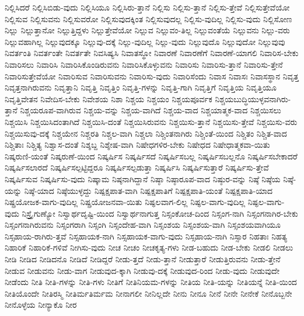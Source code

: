 {ನಿಲ್ಲಿಸಿದರೆ
ನಿಲ್ಲಿಸಿಬಿಡು-ವುದು
ನಿಲ್ಲಿಸಿಯೂ
ನಿಲ್ಲಿಸಿರು-ತ್ತಾನೆ
ನಿಲ್ಲಿಸು
ನಿಲ್ಲಿಸು-ತ್ತಾನೆ
ನಿಲ್ಲಿಸು-ತ್ತೇವೆ
ನಿಲ್ಲಿಸುತ್ತೇವೆಯೋ
ನಿಲ್ಲಿಸುವ
ನಿಲ್ಲಿಸುವನು
ನಿಲ್ಲಿಸುವರೋ
ನಿಲ್ಲಿಸುವುದಕ್ಕಿಂತ
ನಿಲ್ಲಿಸುವುದಲ್ಲ
ನಿಲ್ಲಿಸು-ವುದಿಲ್ಲ
ನಿಲ್ಲಿಸು-ವುದು
ನಿಲ್ಲಿಸೋಣ
ನಿಲ್ಲು
ನಿಲ್ಲುತ್ತಾನೋ
ನಿಲ್ಲುತ್ತಿದ್ದಳು
ನಿಲ್ಲುತ್ತೇವೆಯೋ
ನಿಲ್ಲುವ
ನಿಲ್ಲುವಂ-ತಿಲ್ಲ
ನಿಲ್ಲುವಂತೆಯೆ
ನಿಲ್ಲುವನು
ನಿಲ್ಲು-ವರು
ನಿಲ್ಲುವಹಾಗಿಲ್ಲ
ನಿಲ್ಲುವುದಕ್ಕೂ
ನಿಲ್ಲುವು-ದಕ್ಕೆ
ನಿಲ್ಲು-ವುದಿಲ್ಲ
ನಿಲ್ಲು-ವುದು
ನಿಲ್ಲುವುದೊ
ನಿಲ್ಲುವುದೋ
ನಿಲ್ಲುವುವು
ನಿವರ್ತಂತಿ
ನಿವರ್ತಂತೇ
ನಿವರ್ತತೇ
ನಿವಸಿಷ್ಯಸಿ
ನಿವಾತಸ್ಥೋ
ನಿವಾರಣೆ
ನಿವಾರಣೆಗೆ
ನಿವಾರಣೆ-ಯಾಗಲಿ
ನಿವಾರಿಸ-ಬೇಕು
ನಿವಾರಿಸಲು
ನಿವಾರಿಸಿ
ನಿವಾರಿಸಿಕೊಂಡಿರುವನು
ನಿವಾರಿಸಿಕೊಳ್ಳುವನು
ನಿವಾರಿಸು
ನಿವಾರಿಸು-ತ್ತಾನೆ
ನಿವಾರಿಸು-ತ್ತೇನೆ
ನಿವಾರಿಸುತ್ತೇವೆಯೋ
ನಿವಾರಿಸುವ
ನಿವಾರಿಸುವನು
ನಿವಾರಿಸು-ವುದು
ನಿವಾರಿಸೆಂದು
ನಿವಾಸ
ನಿವಾಸಃ
ನಿವಾಸಸ್ಥಾನ
ನಿವೃತ್ತ
ನಿವೃತ್ತನಾಗಿರುವನು
ನಿವೃತ್ತಾನಿ
ನಿವೃತ್ತಿ
ನಿವೃತ್ತಿಂ
ನಿವೃತ್ತಿ-ಗಳನ್ನು
ನಿವೃತ್ತಿ-ಗಾಗಿ
ನಿವೃತ್ತಿಗೆ
ನಿವೃತ್ತಿಯ
ನಿವೃತ್ತಿಯೂ
ನಿವೃತ್ತಿವೇತನ
ನಿವೇದಿಸ-ಬೇಕು
ನಿವೇಶಯ
ನಿಶಾ
ನಿಶ್ಚಯ
ನಿಶ್ಚಯಂ
ನಿಶ್ಚಯಪೂರ್ವಕ
ನಿಶ್ಚಯಬುದ್ಧಿಯುಳ್ಳವನಾಗಿರು-ತ್ತಾನೆ
ನಿಶ್ಚಯರೂಪ-ವಾಗಿರುವ
ನಿಶ್ಚಯ-ವನ್ನು
ನಿಶ್ಚಯ-ವಾಗಿದೆ
ನಿಶ್ಚಯ-ವಾದ
ನಿಶ್ಚಯಾತ್ಮಕ-ವಾದ
ನಿಶ್ಚಯಿಸಲು
ನಿಶ್ಚಯಿಸಿ
ನಿಶ್ಚಯಿಸಿದಂತಾಗಿದೆ
ನಿಶ್ಚಯಿಸಿ-ದಂತೆ
ನಿಶ್ಚಯಿಸಿರುವನು
ನಿಶ್ಚಯಿಸು-ತ್ತಾನೆ
ನಿಶ್ಚಯಿಸು-ತ್ತೇವೆ
ನಿಶ್ಚಯಿಸು-ವರು
ನಿಶ್ಚಯಿಸುವು-ದಕ್ಕೆ
ನಿಶ್ಚಯೇನ
ನಿಶ್ಚರತಿ
ನಿಶ್ಚಲ-ವಾಗಿ
ನಿಶ್ಚಲಾ
ನಿಶ್ಚಿಂತನಾಗಿರು
ನಿಶ್ಚಿಂತೆ-ಯಿಂದ
ನಿಶ್ಚಿತಂ
ನಿಶ್ಚಿತ-ವಾದ
ನಿಶ್ಚಿತಾಃ
ನಿಶ್ಚಿತ್ಯ
ನಿಶ್ವಾಸ-ದಂತೆ
ನಿಶ್ಶಬ್ದ
ನಿಶ್ಶೇಷ-ವಾಗಿ
ನಿಷೇಧಗಳಿರ-ಬೇಕು
ನಿಷೇಧದ
ನಿಷೇಧಾತ್ಮಕವಾ-ಯಿತು
ನಿಷ್ಕರುಣಿ-ಯಂತೆ
ನಿಷ್ಕರುಣೆ-ಯಿಂದ
ನಿಷ್ಕರ್ಷಿಸ
ನಿಷ್ಕರ್ಷಿಸದೆ
ನಿಷ್ಕರ್ಷಿಸಬಲ್ಲ
ನಿಷ್ಕರ್ಷಿಸಬಲ್ಲನೊ
ನಿಷ್ಕರ್ಷಿಸಬೇಕಾದರೆ
ನಿಷ್ಕರ್ಷಿಸಲಾರದೆ
ನಿಷ್ಕರ್ಷಿಸಲ್ಪಟ್ಟಿದ್ದರೂ
ನಿಷ್ಕರ್ಷಿಸಲ್ಪಡುತ್ತಾ
ನಿಷ್ಕರ್ಷಿಸಿ
ನಿಷ್ಕರ್ಷಿಸುತ್ತಾರೆ
ನಿಷ್ಕರ್ಷಿಸು-ತ್ತೇವೆ
ನಿಷ್ಕರ್ಷಿಸುವ
ನಿಷ್ಕರ್ಷಿಸು-ವುದು
ನಿಷ್ಕಾಮ
ನಿಷ್ಠನಾಗಿದ್ದಾನೆ
ನಿಷ್ಠಾ
ನಿಷ್ಠಾರೂಪ-ವಾದ
ನಿಷ್ಠುರ-ವನ್ನು
ನಿಷ್ಠೆ
ನಿಷ್ಠೆಯ
ನಿಷ್ಠೆ-ಯನ್ನು
ನಿಷ್ಠೆ-ಯಾದ
ನಿಷ್ಠೆಯುಳ್ಳದ್ದು
ನಿಷ್ಪಕ್ಷಪಾತ-ವಾಗಿ
ನಿಷ್ಪಕ್ಷಪಾತಿಗೆ
ನಿಷ್ಪಕ್ಷಪಾತಿ-ಯಂತೆ
ನಿಷ್ಪಕ್ಷಪಾತಿ-ಯಾದ
ನಿಷ್ಪ್ರಯೋಜಕ-ವಾಗು-ವುದಿಲ್ಲ
ನಿಷ್ಪ್ರಯೋಜನವಾ-ಯಿತು
ನಿಷ್ಫಲವಾಗ-ಲಿಲ್ಲ
ನಿಷ್ಫಲ-ವಾಗು-ವುದಿಲ್ಲ
ನಿಷ್ಫಲ-ವಾಗು-ವುದು
ನಿಸ್ತ್ರೈಗುಣ್ಯೋ
ನಿಸ್ವಾರ್ಥದೃಷ್ಟಿ-ಯಿಂದ
ನಿಸ್ವಾರ್ಥನಾಗುತ್ತ
ನಿಸ್ಸಂಕೋಚ-ದಿಂದ
ನಿಸ್ಸಂಗ-ನಾಗಿ
ನಿಸ್ಸಂಗನಾಗಿರ-ಬೇಕು
ನಿಸ್ಸಂಗನಾಗಿರುವನು
ನಿಸ್ಸಂಗರಾಗಿ
ನಿಸ್ಸಂಗಿ
ನಿಸ್ಸಂದೇಹ-ವಾಗಿ
ನಿಸ್ಸಂಶಯ
ನಿಸ್ಸಂಶಯ-ವಾಗಿ
ನಿಸ್ಸಂಶಯವಾಗಿಯೂ
ನಿಸ್ಸಹಾಯ-ರಾಗಿರು-ತ್ತವೆ
ನಿಸ್ಸಹಾಯಕ-ನಾಗಿ
ನಿಸ್ಸಹಾಯಕ-ವಾಗು-ವುದು
ನಿಸ್ಸಹಾಯ-ನಾಗಿ
ನಿಸ್ಸಾರ
ನಿಹತಾಃ
ನಿಹತ್ಯ
ನಿಹಾರಿಕೆ
ನಿಹಾರಿಕೆ-ಗಳಿವೆ
ನೀಗಿಸು-ವುದು
ನೀಚ
ನೀಚಂ
ನೀಚಕೃತ್ಯ-ಗಳು
ನೀಡ-ಬಹುದು
ನೀಡ-ಬೇಕು
ನೀಡಲಿ
ನೀಡಲು
ನೀಡಿ
ನೀಡಿದ
ನೀಡಿದನೊ
ನೀಡಿದೆ
ನೀಡಿದ್ದರೆ
ನೀಡು-ತ್ತದೆ
ನೀಡು-ತ್ತಾನೆ
ನೀಡುತ್ತಾರೆ
ನೀಡುತ್ತಿರುವನು
ನೀಡು-ತ್ತೇನೆ
ನೀಡುವ
ನೀಡುವನು
ನೀಡು-ವಾಗ
ನೀಡುವುದ-ಕ್ಕಾಗಿ
ನೀಡುವು-ದಕ್ಕೆ
ನೀಡುವುದ-ರಿಂದ
ನೀಡು-ವುದು
ನೀಡುವುದೇ
ನೀಡೆಂದು
ನೀತಿ
ನೀತಿ-ಗಳನ್ನು
ನೀತಿ-ಗಳು
ನೀತಿಗೆ
ನೀತಿನಿಯಮ-ಗಳನ್ನು
ನೀತಿಯ
ನೀತಿ-ಯನ್ನು
ನೀತಿಯನ್ನೆ
ನೀತಿ-ಯಿಂದ
ನೀತಿಯೊಂದೇ
ನೀತಿರಸ್ಮಿ
ನೀತಿರ್ಮತಿರ್ಮಮ
ನೀನಾಗಲೀ
ನೀನಿಲ್ಲದೇ
ನೀನು
ನೀನೂ
ನೀನೆ
ನೀನೇ
ನೀನೇಕೆ
ನೀನೊಬ್ಬನೇ
ನೀನೊಳ್ಳೆಯ
ನೀನ್ಯಾಕೊ
ನೀರ
}
